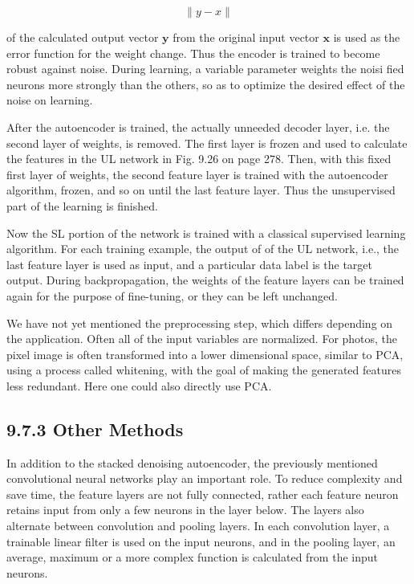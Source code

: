 \documentclass[10pt]{article}
\begin{document}
$$
\|y-x\|
$$

of the calculated output vector $\boldsymbol{y}$ from the original input vector $\boldsymbol{x}$ is used as the error function for the weight change. Thus the encoder is trained to become robust against noise. During learning, a variable parameter weights the noisi
fied neurons more strongly than the others, so as to optimize the desired effect of the noise on learning.

After the autoencoder is trained, the actually unneeded decoder layer, i.e. the second layer of weights, is removed. The first layer is frozen and used to calculate the features in the UL network in Fig. 9.26 on page 278. Then, with this fixed first layer of weights, the second feature layer is trained with the autoencoder algorithm, frozen, and so on until the last feature layer. Thus the unsupervised part of the learning is finished.

Now the SL portion of the network is trained with a classical supervised learning algorithm. For each training example, the output of of the UL network, i.e., the last feature layer is used as input, and a particular data label is the target output. During backpropagation, the weights of the feature layers can be trained again for the purpose of fine-tuning, or they can be left unchanged.

We have not yet mentioned the preprocessing step, which differs depending on the application. Often all of the input variables are normalized. For photos, the pixel image is often transformed into a lower dimensional space, similar to PCA, using a process called whitening, with the goal of making the generated features less redundant. Here one could also directly use PCA.

\subsection*{9.7.3 Other Methods}
In addition to the stacked denoising autoencoder, the previously mentioned convolutional neural networks play an important role. To reduce complexity and save time, the feature layers are not fully connected, rather each feature neuron retains input from only a few neurons in the layer below. The layers also alternate between convolution and pooling layers. In each convolution layer, a trainable linear filter is used on the input neurons, and in the pooling layer, an average, maximum or a more complex function is calculated from the input neurons.
\end{document}
